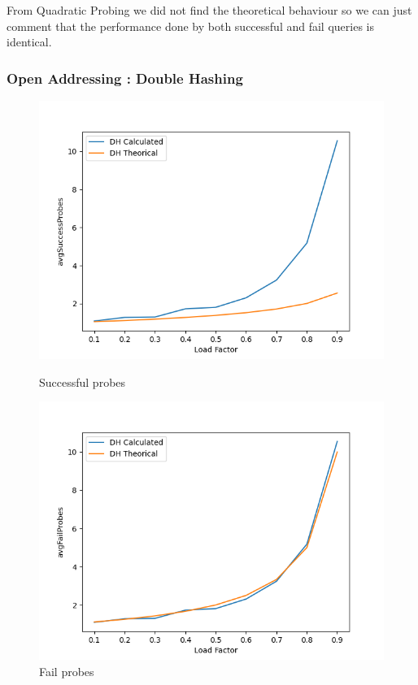 \documentclass{article}
\begin{document}
    From Quadratic Probing we did not find the theoretical behaviour so we can just comment that the performance done by both successful and fail queries is identical. 
    
    \subsubsection*{Open Addressing : Double Hashing}

        \begin{figure}[!h]
          \includegraphics[width=\linewidth]{images/loadFactor_vs_avgSuccessProbes_DH.png}
          \caption{Successful probes}\label{fig:plot8}
        \endminipage\hfill
          \includegraphics[width=\linewidth]{images/loadFactor_vs_avgFailProbes_DH.png}
          \caption{Fail probes}\label{fig:plot9}
        \endminipage
    \end{figure}
    
\end{document}

